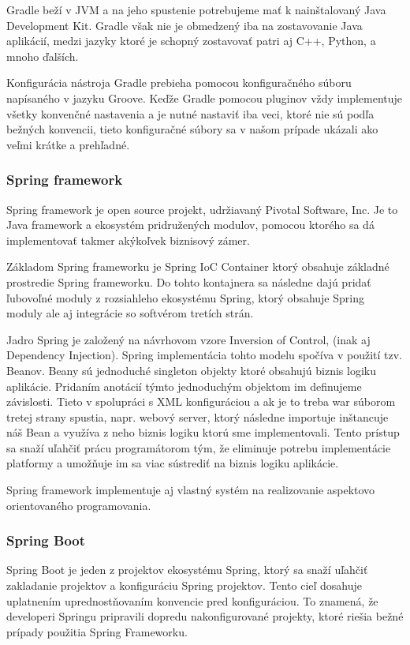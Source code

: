 Gradle beží v JVM a na jeho spustenie potrebujeme mať k nainštalovaný Java Development Kit. Gradle však nie je obmedzený iba na zostavovanie Java aplikácií, medzi jazyky ktoré je schopný zostavovať patri aj C++, Python, a mnoho ďalších.

Konfigurácia nástroja Gradle prebieha pomocou konfiguračného súboru napísaného v jazyku Groove. Keďže Gradle pomocou pluginov vždy implementuje všetky konvenčné nastavenia a je nutné nastaviť iba veci, ktoré nie sú podľa bežných konvencii, tieto konfiguračné  súbory sa v našom prípade ukázali ako veľmi krátke a prehľadné. 

\subsubsection{Spring framework}
Spring framework je open source projekt, udržiavaný  Pivotal Software, Inc. Je to Java framework a ekosystém pridružených modulov, pomocou ktorého sa dá implementovať takmer akýkoľvek biznisový zámer.  

Základom Spring frameworku je Spring IoC Container ktorý obsahuje základné prostredie Spring frameworku. Do tohto kontajnera sa následne dajú pridať ľubovoľné moduly z rozsiahleho ekosystému Spring, ktorý obsahuje Spring moduly ale aj integrácie so softvérom tretích strán.

Jadro Spring je založený na návrhovom vzore Inversion of Control, (inak aj Dependency Injection). Spring implementácia tohto modelu spočíva v použití tzv. Beanov. Beany sú jednoduché singleton objekty ktoré obsahujú biznis logiku aplikácie. Pridaním anotácií týmto jednoduchým objektom im definujeme závislosti. Tieto v spolupráci s XML konfiguráciou a ak je to treba war súborom tretej strany spustia, napr. webový server, ktorý následne importuje inštancuje náš Bean a využíva z neho biznis logiku ktorú sme implementovali. 
Tento prístup sa snaží uľahčiť prácu programátorom tým, že eliminuje potrebu implementácie platformy a umožňuje im sa viac sústrediť na biznis logiku aplikácie.  

Spring framework implementuje aj vlastný systém na realizovanie aspektovo orientovaného programovania.

\subsubsection{Spring Boot}
Spring Boot je jeden z projektov ekosystému Spring, ktorý sa snaží uľahčiť zakladanie projektov a konfiguráciu Spring projektov. Tento cieľ dosahuje uplatnením uprednostňovaním konvencie pred konfiguráciou. To znamená, že developeri Springu pripravili dopredu nakonfigurované projekty, ktoré riešia bežné prípady použitia Spring Frameworku. 

